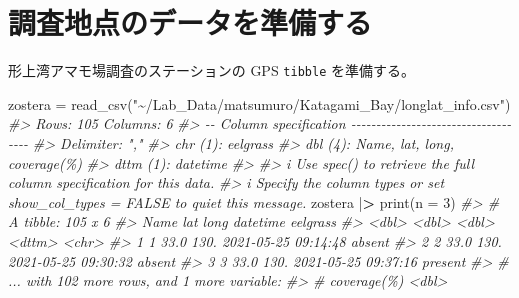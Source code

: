 \documentclass[
]{book}
\newenvironment{Shaded}{\begin{snugshade}}{\end{snugshade}}
\newcommand{\AttributeTok}[1]{\textcolor[rgb]{0.77,0.63,0.00}{#1}}
\newcommand{\CommentTok}[1]{\textcolor[rgb]{0.56,0.35,0.01}{\textit{#1}}}
\newcommand{\DecValTok}[1]{\textcolor[rgb]{0.00,0.00,0.81}{#1}}
\newcommand{\ErrorTok}[1]{\textcolor[rgb]{0.64,0.00,0.00}{\textbf{#1}}}
\newcommand{\FunctionTok}[1]{\textcolor[rgb]{0.00,0.00,0.00}{#1}}
\newcommand{\NormalTok}[1]{#1}
\newcommand{\OtherTok}[1]{\textcolor[rgb]{0.56,0.35,0.01}{#1}}
\newcommand{\SpecialCharTok}[1]{\textcolor[rgb]{0.00,0.00,0.00}{#1}}
\newcommand{\StringTok}[1]{\textcolor[rgb]{0.31,0.60,0.02}{#1}}
\theoremstyle{definition}
\theoremstyle{definition}
\theoremstyle{definition}
\theoremstyle{definition}
\theoremstyle{remark}
\begin{document}
\hypertarget{ux8abfux67fbux5730ux70b9ux306eux30c7ux30fcux30bfux3092ux6e96ux5099ux3059ux308b}{%
\section{調査地点のデータを準備する}\label{ux8abfux67fbux5730ux70b9ux306eux30c7ux30fcux30bfux3092ux6e96ux5099ux3059ux308b}}

形上湾アマモ場調査のステーションの GPS \texttt{tibble} を準備する。

\begin{Shaded}
\begin{Highlighting}[]
\NormalTok{zostera }\OtherTok{=} \FunctionTok{read\_csv}\NormalTok{(}\StringTok{"\textasciitilde{}/Lab\_Data/matsumuro/Katagami\_Bay/longlat\_info.csv"}\NormalTok{)}
\CommentTok{\#\textgreater{} Rows: 105 Columns: 6}
\CommentTok{\#\textgreater{} {-}{-} Column specification {-}{-}{-}{-}{-}{-}{-}{-}{-}{-}{-}{-}{-}{-}{-}{-}{-}{-}{-}{-}{-}{-}{-}{-}{-}{-}{-}{-}{-}{-}{-}{-}{-}{-}{-}{-}}
\CommentTok{\#\textgreater{} Delimiter: ","}
\CommentTok{\#\textgreater{} chr  (1): eelgrass}
\CommentTok{\#\textgreater{} dbl  (4): Name, lat, long, coverage(\%)}
\CommentTok{\#\textgreater{} dttm (1): datetime}
\CommentTok{\#\textgreater{} }
\CommentTok{\#\textgreater{} i Use \textasciigrave{}spec()\textasciigrave{} to retrieve the full column specification for this data.}
\CommentTok{\#\textgreater{} i Specify the column types or set \textasciigrave{}show\_col\_types = FALSE\textasciigrave{} to quiet this message.}
\NormalTok{zostera }\SpecialCharTok{|}\ErrorTok{\textgreater{}} \FunctionTok{print}\NormalTok{(}\AttributeTok{n =} \DecValTok{3}\NormalTok{)}
\CommentTok{\#\textgreater{} \# A tibble: 105 x 6}
\CommentTok{\#\textgreater{}    Name   lat  long datetime            eelgrass}
\CommentTok{\#\textgreater{}   \textless{}dbl\textgreater{} \textless{}dbl\textgreater{} \textless{}dbl\textgreater{} \textless{}dttm\textgreater{}              \textless{}chr\textgreater{}   }
\CommentTok{\#\textgreater{} 1     1  33.0  130. 2021{-}05{-}25 09:14:48 absent  }
\CommentTok{\#\textgreater{} 2     2  33.0  130. 2021{-}05{-}25 09:30:32 absent  }
\CommentTok{\#\textgreater{} 3     3  33.0  130. 2021{-}05{-}25 09:37:16 present }
\CommentTok{\#\textgreater{} \# ... with 102 more rows, and 1 more variable:}
\CommentTok{\#\textgreater{} \#   \textasciigrave{}coverage(\%)\textasciigrave{} \textless{}dbl\textgreater{}}
\end{Highlighting}
\end{Shaded}
\end{document}
